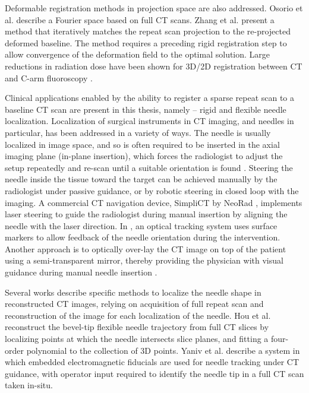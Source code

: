 Deformable registration methods in projection space are also addressed. 
Osorio et al. \cite{osorio2007non} describe a Fourier space based on full CT scans.
Zhang et al. \cite{zhang2014few} present a method that iteratively matches the repeat scan projection to the re-projected deformed baseline. The method requires a preceding rigid registration step to allow convergence of the deformation field to the optimal solution.  
Large reductions in radiation dose have been shown for 3D/2D registration between CT and C-arm fluoroscopy \cite{uneri2014evaluation}.

Clinical applications enabled by the ability to register a sparse repeat scan to a baseline CT scan are present in this thesis, namely -- rigid and flexible needle localization. Localization of surgical instruments in CT imaging, and needles in particular, has been addressed in a variety of ways. The needle is usually localized in image space, and so is often required to be inserted in the axial imaging plane (in-plane insertion), which forces the radiologist to adjust the setup repeatedly and re-scan until a suitable orientation is found \cite{walsh2011smaller}. Steering the needle inside the tissue toward the target can be achieved manually by the radiologist under passive guidance, or by robotic steering in closed loop with the imaging. A commercial CT navigation device, SimpliCT by NeoRad \cite{simpliCT}, implements laser steering to guide the radiologist during manual insertion by aligning the needle with the laser direction. In \cite{schubert2013ct}, an optical tracking system uses surface markers to allow feedback of the needle orientation during the intervention. Another approach is to optically over-lay the CT image on top of the patient using a semi-transparent mirror, thereby providing the physician with visual guidance during manual needle insertion \cite{fichtinger2005image}.

Several works describe specific methods to localize the needle shape in reconstructed CT images, relying on acquisition of full repeat scan and reconstruction of the image for each localization of the needle.
Hou et al. \cite{huo2015shape} reconstruct the bevel-tip flexible needle trajectory from full CT slices by localizing points at which the needle intersects slice planes, and fitting a four-order polynomial to the collection of 3D points.
Yaniv et al. \cite{yaniv2010needle} describe a system in which embedded electromagnetic fiducials are used for needle tracking under CT guidance, with operator input required to identify the needle tip in a full CT scan taken in-situ.

